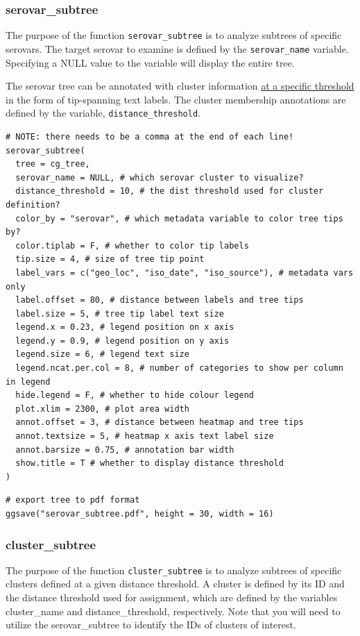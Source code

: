 \documentclass[
]{book}
\begin{document}
\subsubsection{serovar\_subtree}\label{serovar_subtree}

The purpose of the function \texttt{serovar\_subtree} is to analyze subtrees of specific serovars. The target serovar to examine is defined by the \texttt{serovar\_name} variable. Specifying a NULL value to the variable will display the entire tree.

The serovar tree can be annotated with cluster information \ul{at a specific threshold} in the form of tip-spanning text labels. The cluster membership annotations are defined by the variable, \texttt{distance\_threshold}.

\begin{verbatim}
# NOTE: there needs to be a comma at the end of each line!
serovar_subtree(
  tree = cg_tree,
  serovar_name = NULL, # which serovar cluster to visualize?
  distance_threshold = 10, # the dist threshold used for cluster definition?
  color_by = "serovar", # which metadata variable to color tree tips by?
  color.tiplab = F, # whether to color tip labels
  tip.size = 4, # size of tree tip point
  label_vars = c("geo_loc", "iso_date", "iso_source"), # metadata vars only
  label.offset = 80, # distance between labels and tree tips
  label.size = 5, # tree tip label text size
  legend.x = 0.23, # legend position on x axis
  legend.y = 0.9, # legend position on y axis
  legend.size = 6, # legend text size
  legend.ncat.per.col = 8, # number of categories to show per column in legend
  hide.legend = F, # whether to hide colour legend
  plot.xlim = 2300, # plot area width
  annot.offset = 3, # distance between heatmap and tree tips
  annot.textsize = 5, # heatmap x axis text label size
  annot.barsize = 0.75, # annotation bar width
  show.title = T # whether to display distance threshold
)
\end{verbatim}

\begin{verbatim}
# export tree to pdf format
ggsave("serovar_subtree.pdf", height = 30, width = 16)
\end{verbatim}

\subsubsection{cluster\_subtree}\label{cluster_subtree}

The purpose of the function \texttt{cluster\_subtree} is to analyze subtrees of specific clusters defined at a given distance threshold. A cluster is defined by its ID and the distance threshold used for assignment, which are defined by the variables cluster\_name and distance\_threshold, respectively. Note that you will need to utilize the serovar\_subtree to identify the IDs of clusters of interest.
\end{document}
